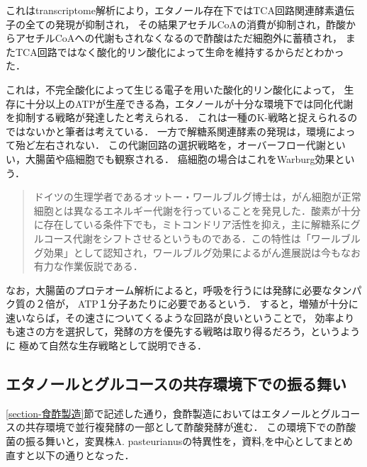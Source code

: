 \documentclass[uplatex, dvipdfmx]{jsarticle}
\begin{document}
これはtranscriptome解析により，エタノール存在下ではTCA回路関連酵素遺伝子の全ての発現が抑制され，
その結果アセチルCoAの消費が抑制され，酢酸からアセチルCoAへの代謝もされなくなるので酢酸はただ細胞外に蓄積され，
またTCA回路ではなく酸化的リン酸化によって生命を維持するからだとわかった\cite{Arai-1}．

これは，不完全酸化によって生じる電子を用いた酸化的リン酸化によって，
生存に十分以上のATPが生産できる為，エタノールが十分な環境下では同化代謝を抑制する戦略が発達したと考えられる．
これは一種のK-戦略と捉えられるのではないかと筆者は考えている．
一方で解糖系関連酵素の発現は，環境によって殆ど左右されない\cite{Arai-2}．
この代謝回路の選択戦略を，オーバーフロー代謝といい，大腸菌や癌細胞でも観察される．
癌細胞の場合はこれをWarburg効果という．
\begin{quote}
    ドイツの生理学者であるオットー・ワールブルグ博士は，がん細胞が正常細胞とは異なるエネルギー代謝を行っていることを発見した．酸素が十分に存在している条件下でも，ミトコンドリア活性を抑え，主に解糖系にグルコース代謝をシフトさせるというものである．この特性は「ワールブルグ効果」として認知され，ワールブルグ効果によるがん進展説は今もなお有力な作業仮説である\cite{がん}．
\end{quote}

なお，大腸菌のプロテオーム解析によると，呼吸を行うには発酵に必要なタンパク質の２倍が，
ATP１分子あたりに必要であるという\cite{大腸菌}．
すると，増殖が十分に速いならば，その速さについてくるような回路が良いということで，
効率よりも速さの方を選択して，発酵の方を優先する戦略は取り得るだろう，というように
極めて自然な生存戦略として説明できる．

\subsection{エタノールとグルコースの共存環境下での振る舞い}

\ref{section-食酢製造}節で記述した通り，食酢製造においてはエタノールとグルコースの共存環境で並行複発酵の一部として酢酸発酵が進む．
この環境下での酢酸菌の振る舞いと，変異株A. pasteurianusの特異性を，資料\cite{Arai-2},\cite{桜井}を中心としてまとめ直すと以下の通りとなった．
\end{document}

